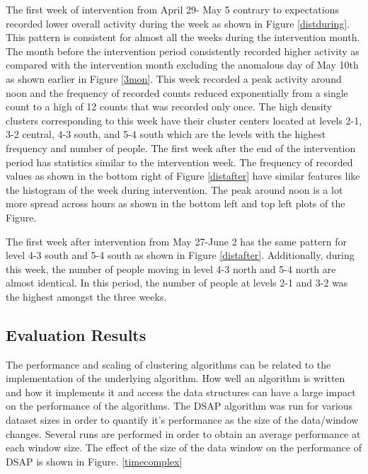 The first week of intervention from April 29- May 5 contrary to expectations recorded lower overall activity during the week as shown in Figure \ref{distduring}. This pattern is consistent for almost all the weeks during the intervention month. The month before the intervention period consistently recorded higher activity as compared with the intervention month excluding the anomalous day of May 10th as shown earlier in Figure \ref{3mon}. This week recorded a peak activity around noon and the frequency of recorded counts reduced exponentially from a single count to a high of 12 counts that was recorded only once. The high density clusters corresponding to this week have their cluster centers located at levels 2-1, 3-2 central, 4-3 south, and 5-4 south which are the levels with the highest frequency and number of people. The first week after the end of the intervention period has statistics similar to the intervention week. The frequency of recorded values as shown in the bottom right of Figure \ref{distafter} have similar features like the histogram of the week during intervention. The peak around noon is a lot more spread across hours as shown in the bottom left and top left plots of the Figure.

The first week after intervention from May 27-June 2 has the same pattern for level 4-3 south and  5-4 south as shown in Figure \ref{distafter}. Additionally, during this week, the number of people moving in level 4-3 north and 5-4 north are almost identical. In this period, the number of people at levels 2-1 and 3-2 was the highest  amongst the three weeks. 



\subsection{Evaluation Results}


The performance and scaling of clustering algorithms can be related to the implementation of the underlying algorithm. How well an algorithm is written and how it implements it and access the data structures can have a large impact on the performance of the algorithms. The DSAP algorithm was run for various dataset sizes in order to quantify it's performance as the size of the data/window changes. Several runs are performed in order to obtain an average performance at each window size. The effect of the size of the data window on the performance of DSAP is shown in Figure. \ref{timecomplex}

